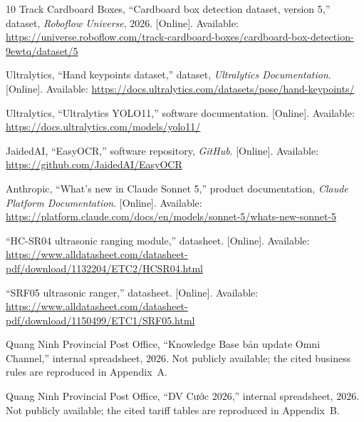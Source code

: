 \begin{thebibliography}{10}
Track Cardboard Boxes, ``Cardboard box detection dataset, version 5,'' dataset,
  \emph{Roboflow Universe}, 2026. [Online]. Available:
  \url{https://universe.roboflow.com/track-cardboard-boxes/cardboard-box-detection-9ewtq/dataset/5}

Ultralytics, ``Hand keypoints dataset,'' dataset, \emph{Ultralytics
  Documentation}. [Online]. Available:
  \url{https://docs.ultralytics.com/datasets/pose/hand-keypoints/}

Ultralytics, ``Ultralytics {YOLO11},'' software documentation. [Online].
  Available: \url{https://docs.ultralytics.com/models/yolo11/}

JaidedAI, ``{EasyOCR},'' software repository, \emph{GitHub}. [Online].
  Available: \url{https://github.com/JaidedAI/EasyOCR}

Anthropic, ``What's new in {Claude Sonnet 5},'' product documentation,
  \emph{Claude Platform Documentation}. [Online]. Available:
  \url{https://platform.claude.com/docs/en/models/sonnet-5/whats-new-sonnet-5}

``{HC-SR04} ultrasonic ranging module,'' datasheet. [Online]. Available:
  \url{https://www.alldatasheet.com/datasheet-pdf/download/1132204/ETC2/HCSR04.html}

``{SRF05} ultrasonic ranger,'' datasheet. [Online]. Available:
  \url{https://www.alldatasheet.com/datasheet-pdf/download/1150499/ETC1/SRF05.html}


Quang Ninh Provincial Post Office, ``{Knowledge Base bản update Omni Channel},''
  internal spreadsheet, 2026. Not publicly available; the cited business rules
  are reproduced in Appendix~A.

Quang Ninh Provincial Post Office, ``{DV Cước 2026},'' internal spreadsheet,
  2026. Not publicly available; the cited tariff tables are reproduced in
  Appendix~B.

\end{thebibliography}
